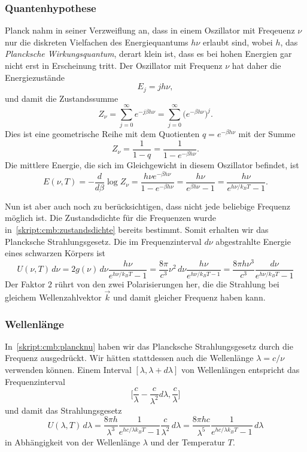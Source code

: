 \subsubsection{Quantenhypothese}
Planck nahm in seiner Verzweiflung an, dass in einem Oszillator mit
Freqeuenz $\nu$ nur die diskreten Vielfachen des Energiequantums $h\nu$ 
erlaubt sind, wobei $h$, das {\em Plancksche Wirkungsquantum}, derart
klein ist, dass es bei hohen Energien gar nicht erst in Erscheinung
tritt.
Der Oszillator mit Frequenz $\nu$ hat daher die Energiezustände
\[
E_j = jh\nu,
\]
und damit die Zustandssumme
\[
Z_\nu
=
\sum_{j=0}^\infty e^{-j\beta h\nu}
=
\sum_{j=0}^\infty \bigl(e^{-\beta h\nu}\bigr)^j.
\]
Dies ist eine geometrische Reihe mit dem Quotienten
$q=e^{-\beta h\nu}$ mit der Summe
\[
Z_\nu
=
\frac1{1-q}=\frac1{1-e^{-\beta h\nu}}.
\]
Die mittlere Energie, die sich im Gleichgewicht in diesem Oszillator 
befindet, ist
\[
E(\nu,T)
=
-\frac{d}{d\beta}\log Z_\nu
=
\frac{h\nu e^{-\beta h \nu}}{1-e^{-\beta h\nu}}
=
\frac{h\nu}{e^{\beta h\nu}-1}
=
\frac{h\nu}{e^{h\nu/k_BT}-1}.
\]

Nun ist aber auch noch zu berücksichtigen, dass nicht jede beliebige
Frequenz möglich ist.
Die Zustandsdichte für die Frequenzen wurde
in~\eqref{skript:cmb:zustandsdichte} bereits bestimmt.
Somit erhalten wir das Plancksche Strahlungsgesetz.
Die im Frequenzinterval $d\nu$ abgestrahlte Energie eines
schwarzen Körpers ist
\begin{equation}
U(\nu,T)\,d\nu
=
2g(\nu)\,d\nu
\frac{h\nu}{e^{h\nu/k_BT}-1}
=
\frac{8\pi}{c^3}\nu^2\,d\nu\frac{h\nu}{e^{h\nu/k_BT-1}}
=
\frac{8\pi h\nu^3}{c^3}\frac{d\nu}{e^{h\nu/k_BT}-1}
\label{skript:cmb:plancknu}
\end{equation}
Der Faktor $2$ rührt von den zwei Polarisierungen her, die die Strahlung
bei gleichem Wellenzahlvektor $\vec{k}$ und damit gleicher Frequenz haben
kann.

\subsubsection{Wellenlänge}
In~\eqref{skript:cmb:plancknu} haben wir das Plancksche Strahlungsgesetz
durch die Frequenz ausgedrückt.
Wir hätten stattdessen auch die Wellenlänge $\lambda=c/\nu$ verwenden 
können.
Einem Interval $[\lambda,\lambda+d\lambda]$ von Wellenlängen entspricht
das Frequenzinterval
\[
\biggl[
\frac{c}{\lambda}-\frac{c}{\lambda^2}d\lambda
,
\frac{c}{\lambda}
\biggr]
\]
und damit das Strahlungsgesetz
\begin{equation}
U(\lambda,T)\,d\lambda
=
\frac{8\pi h}{\lambda^3}\frac{1}{e^{hc/\lambda k_BT}-1}\frac{c}{\lambda^2}\,d\lambda
=
\frac{8\pi hc}{\lambda^5}\frac{1}{e^{hc/\lambda k_BT}-1}\,d\lambda
\label{skript:cmb:planck:lambda}
\end{equation}
in Abhängigkeit von der Wellenlänge $\lambda$ und der Temperatur $T$.


